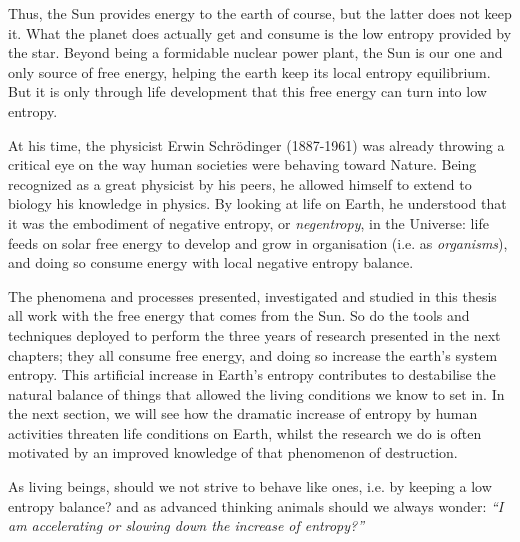 Thus, the Sun provides energy to the earth of course, but the latter does not keep it. What the planet does actually get and consume is the low entropy provided by the star. Beyond being a formidable nuclear power plant, the Sun is our one and only source of free energy, helping the earth keep its local entropy equilibrium. But it is only through life development that this free energy can turn into low entropy.

At his time, the physicist Erwin Schrödinger (1887-1961) was already throwing a critical eye on the way human societies were behaving toward Nature. Being recognized as a great physicist by his peers, he allowed himself to extend to biology his knowledge in physics. By looking at life on Earth, he understood that it was the embodiment of negative entropy, or \textit{negentropy}, in the Universe: life feeds on solar free energy to develop and grow in organisation (i.e. as \textit{organisms}), and doing so consume energy with local negative entropy balance.
\vspace{\baselineskip}


The phenomena and processes presented, investigated and studied in this thesis all work with the free energy that comes from the Sun.
So do the tools and techniques deployed to perform the three years of research presented in the next chapters; they all consume free energy, and doing so increase the earth's system entropy.
This artificial increase in Earth's entropy contributes to destabilise the natural balance of things that allowed the living conditions we know to set in.
In the next section, we will see how the dramatic increase of entropy by human activities threaten life conditions on Earth, whilst the research we do is often motivated by an improved knowledge of that phenomenon of destruction.

As living beings, should we not strive to behave like ones, i.e. by keeping a low entropy balance? and as advanced thinking animals should we always wonder: \textit{``I am accelerating or slowing down the increase of entropy?''} %

